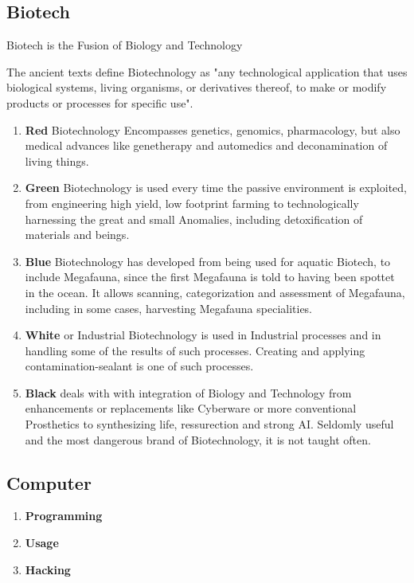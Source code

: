 \subsection{Biotech}\label{subsec:biotech}
Biotech is the Fusion of Biology and Technology \par
The ancient texts define Biotechnology as "any technological application that uses biological systems, living organisms,
or derivatives thereof, to make or modify products or processes for specific use".
\begin{enumerate}[label= -]
    \item \textbf{Red} Biotechnology Encompasses genetics, genomics, pharmacology, but also medical advances like
    genetherapy and automedics and deconamination of living things.
    \item \textbf{Green} Biotechnology is used every time the passive environment is exploited,
    from engineering high yield, low footprint farming to technologically harnessing the great and small Anomalies,
    including detoxification of materials and beings.
    \item \textbf{Blue} Biotechnology has developed from being used for aquatic Biotech, to include Megafauna, since the
    first Megafauna is told to having been spottet in the ocean.
    It allows scanning, categorization and assessment of Megafauna, including in some cases,
    harvesting Megafauna specialities.
    \item \textbf{White} or Industrial Biotechnology  is used in Industrial processes and in handling some of the
    results of such processes.
    Creating and applying contamination-sealant is one of such processes.
    \item \textbf{Black} deals with with integration of Biology and Technology from enhancements or replacements like
    Cyberware or more conventional Prosthetics to synthesizing life, ressurection and strong AI. Seldomly useful
    and the most dangerous brand of Biotechnology, it is not taught often.
\end{enumerate}
\subsection{Computer}\label{subsec:computer}
\begin{enumerate}[label= -]
    \item \textbf{Programming} 
    \item \textbf{Usage} 
    \item \textbf{Hacking} 
\end{enumerate}
